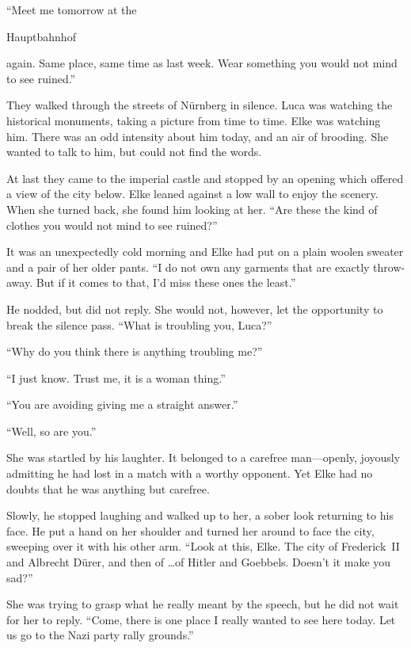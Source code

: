 ``Meet me tomorrow at the \begin{otherlanguage}{ngerman}Hauptbahnhof\end{otherlanguage}{} again. Same place, same time as last week. Wear something you would not mind to see ruined.''

\sectionline

They walked through the streets of Nürnberg in silence. Luca was watching the historical monuments, taking a picture from time to time. Elke was watching him. There was an odd intensity about him today, and an air of brooding. She wanted to talk to him, but could not find the words.

At last they came to the imperial castle and stopped by an opening which offered a view of the city below. Elke leaned against a low wall to enjoy the scenery. When she turned back, she found him looking at her. ``Are these the kind of clothes you would not mind to see ruined?''

It was an unexpectedly cold morning and Elke had put on a plain woolen sweater and a pair of her older pants. ``I do not own any garments that are exactly throw-away. But if it comes to that, I'd miss these ones the least.''

He nodded, but did not reply. She would not, however, let the opportunity to break the silence pass. ``What is troubling you, Luca?''

``Why do you think there is anything troubling me?''

``I just know. Trust me, it is a woman thing.''

``You are avoiding giving me a straight answer.''

``Well, so are you.''

She was startled by his laughter. It belonged to a carefree man---openly, joyously admitting he had lost in a match with a worthy opponent. Yet Elke had no doubts that he was anything but carefree.

Slowly, he stopped laughing and walked up to her, a sober look returning to his face. He put a hand on her shoulder and turned her around to face the city, sweeping over it with his other arm. ``Look at this, Elke. The city of \mbox{Frederick II} and Albrecht Dürer, and then of \ldots of Hitler and Goebbels. Doesn't it make you sad?''

She was trying to grasp what he really meant by the speech, but he did not wait for her to reply. ``Come, there is one place I really wanted to see here today. Let us go to the Nazi party rally grounds.''

